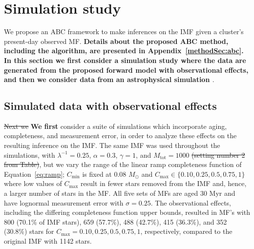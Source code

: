 \documentclass[ejs]{imsart}
\numberwithin{equation}{section}
\theoremstyle{plain}
\newcommand{\new}[1]{{\bf #1}}
\newcommand{\remove}[1]{\st{#1}}
\newcommand{\Msun}{M_{\odot}}
\newcommand{\Cmin}{C_{\text{min}}}
\newcommand{\Cmax}{C_{\text{max}}}
\newcommand{\Mtot}{M_{\text{tot}}}
\begin{document}
\section{Simulation study}

We propose an ABC framework to make inferences on the IMF given a cluster's present-day observed MF.  \new{Details about the proposed ABC method, including the algorithm, are presented in Appendix~\ref{methodSec:abc}.  In this section we first consider a simulation study where the data are generated from the proposed forward model with observational effects, and then we consider data from an astrophysical simulation  \citep{Bate2012, Bate2014}}.


\subsection{Simulated data with observational effects} \label{sec:sim_obs}

\remove{Next we} \new{We first} consider a suite of simulations which incorporate
aging, completeness, and measurement error, in order to analyze these effects on the resulting inference on the IMF.  
The same IMF was used throughout the simulations, with
$\lambda^{-1} = 0.25$, $\alpha = 0.3$, $\gamma = 1$, and $\Mtot = 1000$ \remove{(setting number 2 from Table)}, but we vary the range of the linear ramp completeness function of Equation~\eqref{eq:ramp}; $\Cmin$ is fixed at 0.08 $\Msun$ and $\Cmax \in \{0.10, 0.25, 0.5, 0.75, 1\}$ where low values of $\Cmax$ result in fewer stars removed from the IMF and, hence, a larger number of stars in the MF.  
All five sets of MFs are aged 30 Myr and have lognormal measurement error with $\sigma = 0.25$.  
The observational effects, including the differing completeness function upper bounds, resulted in MF's with 800 (70.1\% of IMF stars), 659 (57.7\%), 488 (42.7\%), 415 (36.3\%), and 352 (30.8\%) stars for $\Cmax = 0.10, 0.25, 0.5, 0.75, 1$, respectively, compared to the original IMF with 1142 stars.
\end{document}
